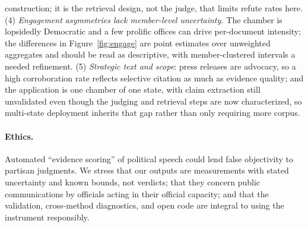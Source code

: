 construction; it is the retrieval design, not the judge, that limits refute rates here. (4)
\emph{Engagement asymmetries lack member-level uncertainty.} The chamber is lopsidedly Democratic and a
few prolific offices can drive per-document intensity; the differences in Figure~\ref{fig:engage} are
point estimates over unweighted aggregates and should be read as descriptive, with member-clustered
intervals a needed refinement. (5) \emph{Strategic text and scope}: press releases are advocacy, so a
high corroboration rate reflects selective citation as much as evidence quality; and the application is
one chamber of one state, with claim extraction still unvalidated even though the judging and retrieval
steps are now characterized, so multi-state deployment inherits that gap rather than only requiring more
corpus.

\paragraph{Ethics.} Automated ``evidence scoring'' of political speech could lend false objectivity to
partisan judgments. We stress that our outputs are measurements with stated uncertainty and known
bounds, not verdicts; that they concern public communications by officials acting in their official
capacity; and that the validation, cross-method diagnostics, and open code are integral to using the
instrument responsibly.

